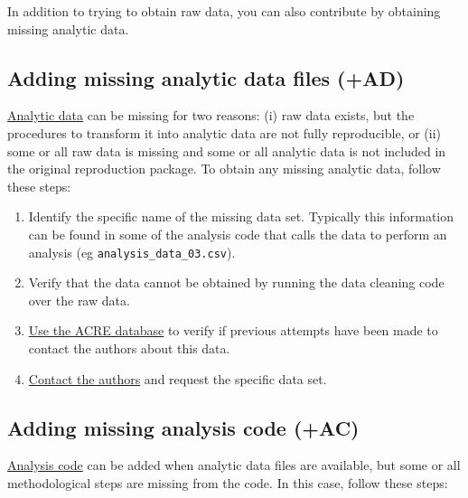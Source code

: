 \documentclass[]{book}
\providecommand{\tightlist}{%
  \setlength{\itemsep}{0pt}\setlength{\parskip}{0pt}}
\begin{document}
In addition to trying to obtain raw data, you can also contribute by obtaining missing analytic data.

\hypertarget{ad}{%
\subsection{Adding missing analytic data files (+AD)}\label{ad}}

\protect\hyperlink{describe-inputs}{Analytic data} can be missing for two reasons: (i) raw data exists, but the procedures to transform it into analytic data are not fully reproducible, or (ii) some or all raw data is missing and some or all analytic data is not included in the original reproduction package. To obtain any missing analytic data, follow these steps:

\begin{enumerate}
\def\labelenumi{\arabic{enumi}.}
\tightlist
\item
  Identify the specific name of the missing data set. Typically this information can be found in some of the analysis code that calls the data to perform an analysis (eg \texttt{analysis\_data\_03.csv}).\\
\item
  Verify that the data cannot be obtained by running the data cleaning code over the raw data.\\
\item
  \href{ADD\%20LINK}{Use the ACRE database} to verify if previous attempts have been made to contact the authors about this data.\\
\item
  \protect\hyperlink{tips-for-communication}{Contact the authors} and request the specific data set.
\end{enumerate}

\hypertarget{ac}{%
\subsection{Adding missing analysis code (+AC)}\label{ac}}

\protect\hyperlink{describe-inputs}{Analysis code} can be added when analytic data files are available, but some or all methodological steps are missing from the code. In this case, follow these steps:
\end{document}

